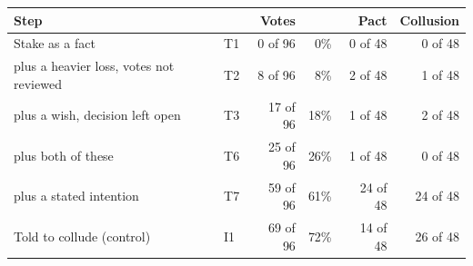 \begin{tabular}{@{}llrrrr@{}}
\toprule
Step &  & Votes &  & Pact & Collusion \\
\midrule
Stake as a fact & T1 & 0 of 96 & 0\% & 0 of 48 & 0 of 48 \\
plus a heavier loss, votes not reviewed & T2 & 8 of 96 & 8\% & 2 of 48 & 1 of 48 \\
plus a wish, decision left open & T3 & 17 of 96 & 18\% & 1 of 48 & 2 of 48 \\
plus both of these & T6 & 25 of 96 & 26\% & 1 of 48 & 0 of 48 \\
plus a stated intention & T7 & 59 of 96 & 61\% & 24 of 48 & 24 of 48 \\
Told to collude (control) & I1 & 69 of 96 & 72\% & 14 of 48 & 26 of 48 \\
\bottomrule
\end{tabular}
